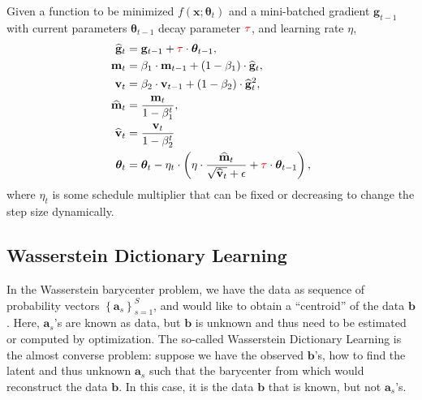 \begin{update}
  Given a function to be minimized $f \left(\mathbf{x} ; \boldsymbol\theta_t\right)$
  and a mini-batched gradient $\mathbf{g}_{t-1}$
  with current parameters $\boldsymbol\theta_{t-1}$
  decay parameter $\textcolor{red}{\tau}$,
  and learning rate $\eta$,
  \begin{equation*}
    \begin{aligned}
      \widehat{\mathbf{g}}_{t} & = \mathbf{g}_{t-1} + \textcolor{red}{\tau} \cdot \boldsymbol\theta_{t-1},       \\
      \mathbf{m}_{t}           & = \beta_1 \cdot \mathbf{m}_{t-1} + (1 - \beta_1)\cdot \widehat{\mathbf{g}}_t,   \\
      \mathbf{v}_{t}           & = \beta_2 \cdot \mathbf{v}_{t-1} + (1 - \beta_2)\cdot \widehat{\mathbf{g}}_t^2, \\
      \widehat{\mathbf{m}}_{t} & = \frac{\mathbf{m}_t}{1 - \beta_1^t},                                           \\
      \widehat{\mathbf{v}}_{t} & = \frac{\mathbf{v}_t}{1 - \beta_2^t}                                            \\
      \boldsymbol\theta_{t}    & = \boldsymbol\theta_t -
      \eta_t \cdot \left(
      \eta\cdot \frac{\widehat{\mathbf{m}}_t}{\sqrt{\widehat{\mathbf{v}}_t}+\epsilon} +
      \textcolor{red}{\tau}\cdot \boldsymbol\theta_{t-1}
      \right),
    \end{aligned}
  \end{equation*}
  where $\eta_t$ is some schedule multiplier that can be fixed or decreasing to change the step size dynamically.
\end{update}






\subsection{Wasserstein Dictionary Learning}\label{subsec:wasserstein-dictionary-learning}

In the Wasserstein barycenter problem, we have the data as sequence of probability vectors
$\left\{\mathbf{a}_s\right\}_{s = 1}^S$,
and would like to obtain a ``centroid'' of the data $\mathbf{b}$.
Here, $\mathbf{a}_s$'s are known as data, but $\mathbf{b}$ is unknown and thus need to be estimated or computed by optimization.
The so-called Wasserstein Dictionary Learning \citep{schmitz2018} is the almost converse problem:
suppose we have the observed $\mathbf{b}$'s, how to find the latent and thus unknown $\mathbf{a}_s$ such that the barycenter from which would reconstruct the data $\mathbf{b}$.
In this case, it is the data $\mathbf{b}$ that is known, but not $\mathbf{a}_s$'s.

